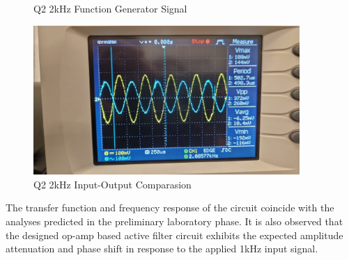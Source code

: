 \begin{figure}[h]
\begin{minipage}{0.5\textwidth}
        \caption{Q2 2kHz Function Generator Signal}
        \label{fig:q2-2khz-1vpp-signal}
    \end{minipage}%
    \begin{minipage}{0.5\textwidth}
        \includegraphics[width=0.9\textwidth , height=0.2\textheight]{assets/exp/q2-2khz-1vpp-comp.jpeg}
        \caption{Q2 2kHz Input-Output Comparasion}
        \label{fig:q2-2khz-1vpp-comp}
    \end{minipage}
\end{figure}

The transfer function and frequency response of the circuit coincide with the analyses predicted in the preliminary laboratory phase. It is also observed that the designed op-amp based active filter circuit exhibits the expected amplitude attenuation and phase shift in response to the applied 1kHz input signal.
